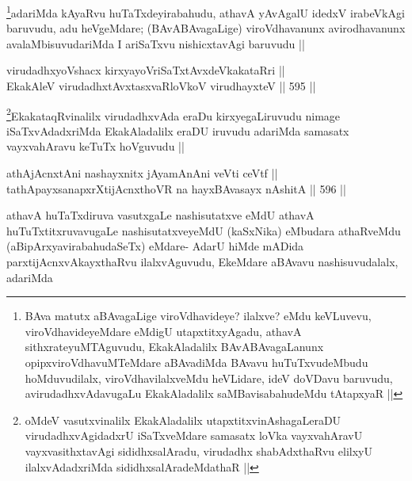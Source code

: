 \begin{artha}
\footnote{BAva matutx aBAvagaLige viroVdhavideye? ilalxve? eMdu keVLuvevu, viroVdhavideyeMdare eMdigU utapxtitxyAgadu, athavA sithxrateyuMTAguvudu, EkakAladalilx BAvABAvagaLanunx opipxviroVdhavuMTeMdare aBAvadiMda BAvavu huTuTxvudeMbudu hoMduvudilalx, viroVdhavilalxveMdu heVLidare, ideV doVDavu baruvudu, avirudadhxvAdavugaLu EkakAladalilx saMBavisabahudeMdu tAtapxyaR ||}adariMda kAyaRvu huTaTxdeyirabahudu, athavA yAvAgalU idedxV irabeVkAgi baruvudu, adu heVgeMdare; (BAvABAvagaLige) viroVdhavanunx avirodhavanunx avalaMbisuvudariMda I ariSaTxvu nishicxtavAgi baruvudu ||
\end{artha}


\begin{shl}
virudadhxyoVshacx kirxyayoVriSaTxtAvxdeVkakataRri || \\
EkakAleV virudadhxtAvxtasxvaRloVkoV virudhayxteV ||  595 ||  
\end{shl}

\begin{artha}
\footnote{oMdeV vasutxvinalilx EkakAladalilx utapxtitxvinAshagaLeraDU virudadhxvAgidadxrU iSaTxveMdare samasatx loVka vayxvahAravU vayxvasithxtavAgi sididhxsalAradu, virudadhx shabAdxthaRvu elilxyU ilalxvAdadxriMda sididhxsalAradeMdathaR ||}EkakataqRvinalilx virudadhxvAda eraDu kirxyegaLiruvudu nimage iSaTxvAdadxriMda EkakAladalilx eraDU iruvudu adariMda samasatx vayxvahAravu keTuTx hoVguvudu ||
\end{artha}


\begin{shl}
athAjAcnxtAni nashayxnitx jAyamAnAni veVti ceVtf || \\
tathA\s payxsanapxrXtijAcnxthoVR na hayxBAvasayx nAshitA ||  596 ||  
\end{shl}

\begin{artha}
athavA huTaTxdiruva vasutxgaLe nashisutatxve eMdU athavA huTuTxtitxruvavugaLe nashisutatxveyeMdU (kaSxNika) eMbudara athaRveMdu (aBipArxyavirabahudaSeTx) eMdare- AdarU hiMde mADida parxtijAcnxvAkayxthaRvu ilalxvAguvudu, EkeMdare aBAvavu nashisuvudalalx, adariMda
\end{artha}


